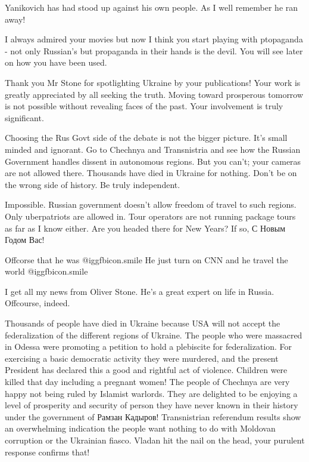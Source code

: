 \begin{itemize}
Yanikovich has had stood up against his own people. As I well remember he ran away!

I always admired your movies but now I think you start playing with ptopaganda
- not only Russian's but propaganda in their hands is the devil. You will see
later on how you have been used.



Thank you Mr Stone for spotlighting Ukraine by your publications! Your work is
greatly appreciated by all seeking the truth. Moving toward prosperous tomorrow
is not possible without revealing faces of the past. Your involvement is truly
significant.


Choosing the Rus Govt side of the debate is not the bigger picture. It's small
minded and ignorant. Go to Chechnya and Transnistria and see how the Russian
Government handles dissent in autonomous regions. But you can't; your cameras
are not allowed there. Thousands have died in Ukraine for nothing. Don't be on
the wrong side of history. Be truly independent.

\begin{itemize} %

Impossible. Russian government doesn't allow freedom of travel to such regions.
Only uberpatriots are allowed in. Tour operators are not running package tours
as far as I know either. Are you headed there for New Years? If so, С Новым
Годом Вас!

Offcorse that he was  @igg{fbicon.smile}  He just turn on CNN and he travel the world  @igg{fbicon.smile} 

I get all my news from Oliver Stone. He's a great expert on life in Russia. Offcourse, indeed.


Thousands of people have died in Ukraine because USA will not accept the
federalization of the different regions of Ukraine. The people who were
massacred in Odessa were promoting a petition to hold a plebiscite for
federalization. For exercising a basic democratic activity they were murdered,
and the present President has declared this a good and rightful act of
violence. Children were killed that day including a pregnant women! The people
of Chechnya are very happy not being ruled by Islamist warlords. They are
delighted to be enjoying a level of prosperity and security of person they have
never known in their history under the government of Рамзан Кадыров!
Transnistrian referendum results show an overwhelming indication the people
want nothing to do with Moldovan corruption or the Ukrainian fiasco. Vladan hit
the nail on the head, your purulent response confirms that!


\end{itemize}
\end{itemize}
